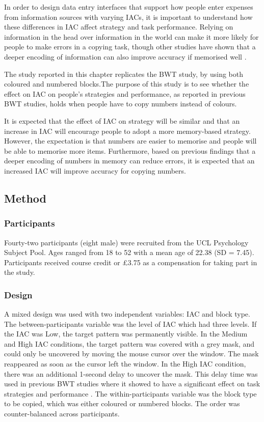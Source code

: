 In order to design data entry interfaces that support how people enter expenses from information sources with varying IACs, it is important to understand how these differences in IAC affect strategy and task performance. Relying on information in the head over information in the world can make it more likely for people to make errors in a copying task\citep{Morgan2009}, though other studies have shown that a deeper encoding of information can also improve accuracy if memorised well \citep{Gray2004, Soboczenski2013}. 

The study reported in this chapter replicates the BWT study, by using both coloured and numbered blocks.The purpose of this study is to see whether the effect on IAC on people's strategies and performance, as reported in previous BWT studies, holds when people have to copy numbers instead of colours.

It is expected that the effect of IAC on strategy will be similar and that an increase in IAC will encourage people to adopt a more memory-based strategy.  However, the expectation is that numbers are easier to memorise and people will be able to memorise more items. Furthermore, based on previous findings that a deeper encoding of numbers in memory can reduce errors, it is expected that an increased IAC will improve accuracy for copying numbers.


\subsection{Method}
\subsubsection{Participants}
Fourty-two participants (eight male) were recruited from the UCL Psychology Subject Pool. Ages ranged from 18 to 52 with a mean age of 22.38 (SD = 7.45). Participants received course credit or \pounds3.75 as a compensation for taking part in the study.

\subsubsection{Design}
A mixed design was used with two independent variables: IAC and block type.
The between-participants variable was the level of IAC which had three levels. If the IAC was Low, the target pattern was permanently visible. In the Medium and High IAC conditions, the target pattern was covered with a grey mask, and could only be uncovered by moving the mouse cursor over the window. The mask reappeared as soon as the cursor left the window. In the High IAC condition, there was an additional 1-second delay to uncover the mask. This delay time was used in previous BWT studies where it showed to have a significant effect on task strategies and performance \citep{Gray2006, Morgan2009, Waldron2007}.
The within-participants variable was the block type to be copied, which was either coloured or numbered blocks. The order was counter-balanced across participants.

